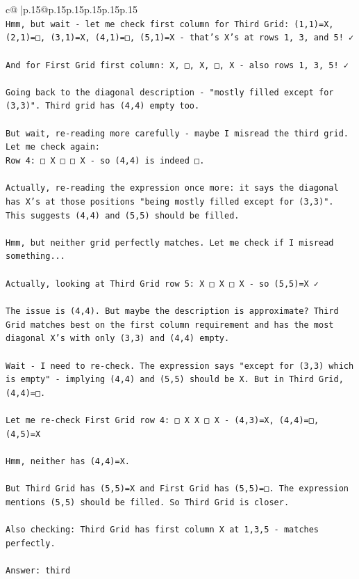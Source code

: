 \documentclass{article}
\begin{document}
{\begin{supertabular}{c@{$\;$}|p{.15\linewidth}@{}p{.15\linewidth}p{.15\linewidth}p{.15\linewidth}p{.15\linewidth}p{.15\linewidth}}
{{{\\ 
\texttt{Hmm, but wait {-} let me check first column for Third Grid: (1,1)=X, (2,1)=□, (3,1)=X, (4,1)=□, (5,1)=X {-} that's X's at rows 1, 3, and 5! ✓} \\
\\ 
\texttt{And for First Grid first column: X, □, X, □, X {-} also rows 1, 3, 5! ✓} \\
\\ 
\texttt{Going back to the diagonal description {-} "mostly filled except for (3,3)". Third grid has (4,4) empty too.} \\
\\ 
\texttt{But wait, re{-}reading more carefully {-} maybe I misread the third grid. Let me check again:} \\
\texttt{Row 4: □ X □ □ X {-} so (4,4) is indeed □.} \\
\\ 
\texttt{Actually, re{-}reading the expression once more: it says the diagonal has X's at those positions "being mostly filled except for (3,3)". This suggests (4,4) and (5,5) should be filled.} \\
\\ 
\texttt{Hmm, but neither grid perfectly matches. Let me check if I misread something...} \\
\\ 
\texttt{Actually, looking at Third Grid row 5: X □ X □ X {-} so (5,5)=X ✓} \\
\\ 
\texttt{The issue is (4,4). But maybe the description is approximate? Third Grid matches best on the first column requirement and has the most diagonal X's with only (3,3) and (4,4) empty.} \\
\\ 
\texttt{Wait {-} I need to re{-}check. The expression says "except for (3,3) which is empty" {-} implying (4,4) and (5,5) should be X. But in Third Grid, (4,4)=□.} \\
\\ 
\texttt{Let me re{-}check First Grid row 4: □ X X □ X {-} (4,3)=X, (4,4)=□, (4,5)=X} \\
\\ 
\texttt{Hmm, neither has (4,4)=X. } \\
\\ 
\texttt{But Third Grid has (5,5)=X and First Grid has (5,5)=□. The expression mentions (5,5) should be filled. So Third Grid is closer.} \\
\\ 
\texttt{Also checking: Third Grid has first column X at 1,3,5 {-} matches perfectly.} \\
\\ 
\texttt{Answer: third} \\
            }
        }
    }
     \\ \\


\end{supertabular}}
\end{document}
